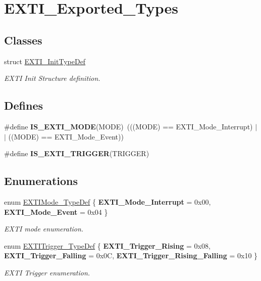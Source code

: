 \hypertarget{group__EXTI__Exported__Types}{
\section{EXTI\_\-Exported\_\-Types}
\label{group__EXTI__Exported__Types}
}
\subsection*{Classes}
\begin{DoxyCompactItemize}
\item 
struct \hyperlink{structEXTI__InitTypeDef}{EXTI\_\-InitTypeDef}
\begin{DoxyCompactList}\small\item\em EXTI Init Structure definition. \item\end{DoxyCompactList}\end{DoxyCompactItemize}
\subsection*{Defines}
\begin{DoxyCompactItemize}
\item 
\hypertarget{group__EXTI__Exported__Types_ga8429170f3320b90227f9f5b252c1c5eb}{
\#define {\bfseries IS\_\-EXTI\_\-MODE}(MODE)~(((MODE) == EXTI\_\-Mode\_\-Interrupt) $|$$|$ ((MODE) == EXTI\_\-Mode\_\-Event))}
\label{group__EXTI__Exported__Types_ga8429170f3320b90227f9f5b252c1c5eb}

\item 
\#define {\bfseries IS\_\-EXTI\_\-TRIGGER}(TRIGGER)
\end{DoxyCompactItemize}
\subsection*{Enumerations}
\begin{DoxyCompactItemize}
\item 
enum \hyperlink{group__EXTI__Exported__Types_gad5e69af98dc0dfdf64417adc1cf57929}{EXTIMode\_\-TypeDef} \{ {\bfseries EXTI\_\-Mode\_\-Interrupt} =  0x00, 
{\bfseries EXTI\_\-Mode\_\-Event} =  0x04
 \}
\begin{DoxyCompactList}\small\item\em EXTI mode enumeration. \item\end{DoxyCompactList}\item 
enum \hyperlink{group__EXTI__Exported__Types_ga9da190f5425d1b421a06bced8cc48e9b}{EXTITrigger\_\-TypeDef} \{ {\bfseries EXTI\_\-Trigger\_\-Rising} =  0x08, 
{\bfseries EXTI\_\-Trigger\_\-Falling} =  0x0C, 
{\bfseries EXTI\_\-Trigger\_\-Rising\_\-Falling} =  0x10
 \}
\begin{DoxyCompactList}\small\item\em EXTI Trigger enumeration. \item\end{DoxyCompactList}\end{DoxyCompactItemize}


